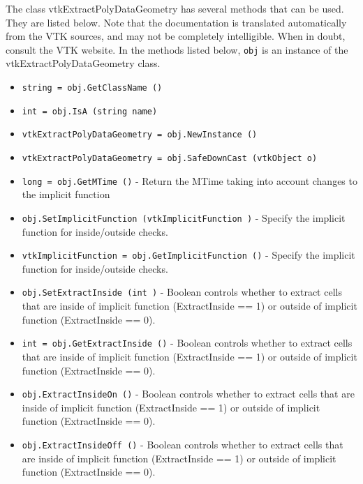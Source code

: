 The class vtkExtractPolyDataGeometry has several methods that can be used.
  They are listed below.
Note that the documentation is translated automatically from the VTK sources,
and may not be completely intelligible.  When in doubt, consult the VTK website.
In the methods listed below, \verb|obj| is an instance of the vtkExtractPolyDataGeometry class.
\begin{itemize}
\item  \verb|string = obj.GetClassName ()|

\item  \verb|int = obj.IsA (string name)|

\item  \verb|vtkExtractPolyDataGeometry = obj.NewInstance ()|

\item  \verb|vtkExtractPolyDataGeometry = obj.SafeDownCast (vtkObject o)|

\item  \verb|long = obj.GetMTime ()| -  Return the MTime taking into account changes to the implicit function

\item  \verb|obj.SetImplicitFunction (vtkImplicitFunction )| -  Specify the implicit function for inside/outside checks.

\item  \verb|vtkImplicitFunction = obj.GetImplicitFunction ()| -  Specify the implicit function for inside/outside checks.

\item  \verb|obj.SetExtractInside (int )| -  Boolean controls whether to extract cells that are inside of implicit 
 function (ExtractInside == 1) or outside of implicit function 
 (ExtractInside == 0).

\item  \verb|int = obj.GetExtractInside ()| -  Boolean controls whether to extract cells that are inside of implicit 
 function (ExtractInside == 1) or outside of implicit function 
 (ExtractInside == 0).

\item  \verb|obj.ExtractInsideOn ()| -  Boolean controls whether to extract cells that are inside of implicit 
 function (ExtractInside == 1) or outside of implicit function 
 (ExtractInside == 0).

\item  \verb|obj.ExtractInsideOff ()| -  Boolean controls whether to extract cells that are inside of implicit 
 function (ExtractInside == 1) or outside of implicit function 
 (ExtractInside == 0).


\end{itemize}
